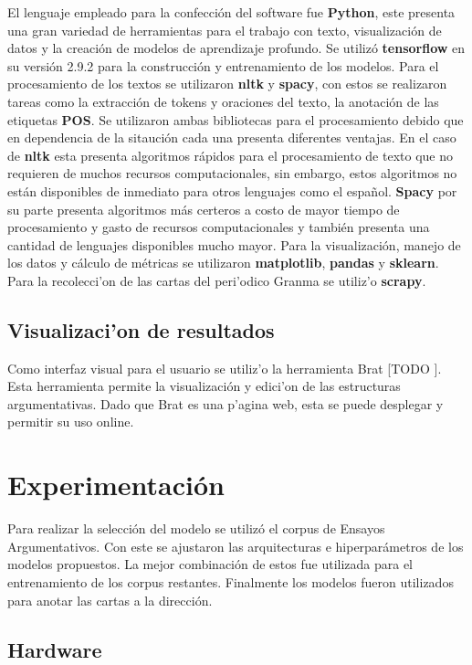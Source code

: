 El lenguaje empleado para la confección del software fue \textbf{Python}, este presenta una gran variedad de herramientas 
para el trabajo con texto, visualización de datos y la creación de modelos de aprendizaje profundo.
Se utilizó \textbf{tensorflow} en su versión 2.9.2 para la construcción y entrenamiento de los modelos. 
Para el procesamiento de los textos se utilizaron \textbf{nltk} y \textbf{spacy}, con estos se realizaron tareas
como la extracción de tokens y oraciones del texto, la anotación de las etiquetas \textbf{POS}. Se utilizaron 
ambas bibliotecas para el procesamiento debido que en dependencia de la sitaución cada una presenta diferentes
ventajas. En el caso de \textbf{nltk} esta presenta algoritmos rápidos para el procesamiento de texto que no 
requieren de muchos recursos computacionales, sin embargo, estos algoritmos no están disponibles de inmediato
para otros lenguajes como el español. \textbf{Spacy} por su parte presenta algoritmos más certeros a costo 
de mayor tiempo de procesamiento y gasto de recursos computacionales y también presenta una cantidad de lenguajes 
disponibles mucho mayor. Para la visualización, manejo de los datos y cálculo de métricas se utilizaron 
\textbf{matplotlib}, \textbf{pandas} y \textbf{sklearn}. Para la recolecci'on de las cartas del peri'odico 
Granma se utiliz'o \textbf{scrapy}.

\subsection{Visualizaci'on de resultados}

Como interfaz visual para el usuario se utiliz'o la herramienta Brat [TODO \cite{}]. Esta herramienta permite
la visualización y edici'on de las estructuras argumentativas. Dado que Brat es una p'agina web, esta se puede
desplegar y permitir su uso online.  

\section{Experimentación}

Para realizar la selección del modelo se utilizó el corpus de Ensayos Argumentativos. Con este se ajustaron
las arquitecturas e hiperparámetros de los modelos propuestos. La mejor combinación de estos fue utilizada para el entrenamiento de
los corpus restantes. Finalmente los modelos fueron utilizados para anotar las cartas a la dirección. 

\subsection{Hardware}

